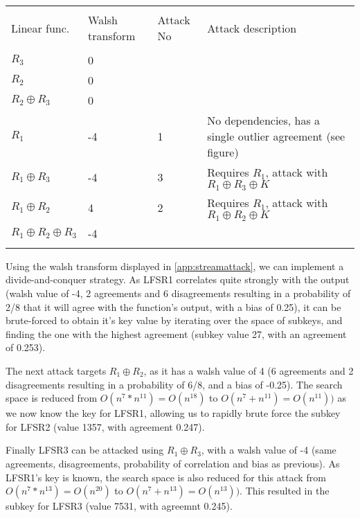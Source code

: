 \documentclass[british,11pt,a4paper]{article}
\begin{document}
\begin{center}
\begin{tabular}{@{}llll@{}}\label{tab:streamattack} \\
  \toprule \\
  Linear func. & Walsh transform & Attack No & Attack description \\
  \midrule \\
  \(R_3\) & 0 \\
  \(R_2\) & 0 & & \\
  \(R_2 \oplus R_3\) & 0 & & \\
  \(R_1\) & -4 & 1 & No dependencies, has a single outlier agreement (see figure)\\
  \(R_1 \oplus R_3\) & -4 & 3 & Requires \(R_1\), attack with \(R_1 \oplus R_3 \oplus K\)\\
  \(R_1 \oplus R_2\) & 4 & 2 & Requires \(R_1\), attack with \(R_1 \oplus R_2 \oplus K\)\\
  \(R_1 \oplus R_2 \oplus R_3\) & -4 & & \\

  \bottomrule \\
\end{tabular}
\end{center}
Using the walsh transform displayed in \autoref{app:streamattack}, we can implement a divide-and-conquer strategy.
As LFSR1 correlates quite strongly with the output (walsh value of -4, 2 agreements and 6 disagreements resulting in a probability of 2/8 that it will agree with the function's output, with a bias of 0.25),
it can be brute-forced to obtain it's key value by iterating over the space of subkeys, and finding the one with the highest agreement (subkey value 27, with an agreement of 0.253).

The next attack targets \(R_1 \oplus R_2\), as it has a walsh value of 4 (6 agreements and 2 disagreements resulting in a probability of 6/8, and a bias of -0.25).
The search space is reduced from \(O(n^{7} * n^{11})=O(n^{18})\) to \(O(n^7 + n^{11})=O(n^{11}))\) as we now know the key for LFSR1, allowing us to rapidly brute force the subkey for LFSR2 (value 1357, with agreement 0.247).

Finally LFSR3 can be attacked using \(R_1 \oplus R_3\), with a walsh value of -4 (same agreements, disagreements, probability of correlation and bias as previous).
As LFSR1's key is known, the search space is also reduced for this attack from \(O(n^{7} * n^{13})=O(n^{20})\) to \(O(n^7 + n^{13})=O(n^{13}))\). This resulted in the subkey for LFSR3 (value 7531, with agreemnt 0.245).
\end{document}
